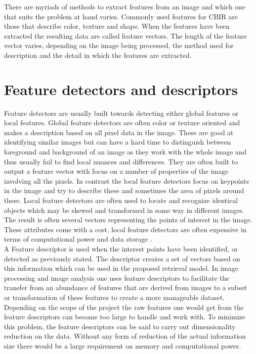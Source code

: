 There are myriads of methods to extract features from an image and which one that suits the problem at hand varies. Commonly used features for CBIR are those that describe color, texture and shape. When the features have been extracted the resulting data are called feature vectors. The length of the feature vector varies, depending on the image being processed, the method used for description and the detail in which the features are extracted. 

\section{Feature detectors and descriptors}
\label{sec:feature_descriptors}
Feature detectors are usually built towards detecting either global features or local features. Global feature detectors are often color or texture oriented and makes a description based on all pixel data in the image. These are good at identifying similar images but can have a hard time to distinguish between foreground and background of an image as they work with the whole image and thus usually fail to find local nuances and differences. They are often built to output a feature vector with focus on a number of properties of the image involving all the pixels. In contrast the local feature detectors focus on keypoints in the image and try to describe these and sometimes the area of pixels around these. Local feature detectors are often used to locate and recognize identical objects which may be skewed and transformed in some way in different images. The result is often several vectors representing the points of interest in the image. These attributes come with a cost, local feature detectors are often expensive in terms of computational power and data storage \cite{hassaballah2016image}. \\

A Feature descriptor is used when the interest points have been identified, or detected as previously stated. The descriptor creates a set of vectors based on this information which can be used in the proposed retrieval model. In image processing and image analysis one uses feature descriptors to facilitate the transfer from an abundance of features that are derived from images to a subset or transformation of these features to create a more manageable dataset. Depending on the scope of the project the raw features one would get from the feature descriptors can become too large to handle and work with. To minimize this problem, the feature descriptors can be said to carry out dimensionality reduction on the data. Without any form of reduction of the actual information size there would be a large requirement on memory and computational power.

